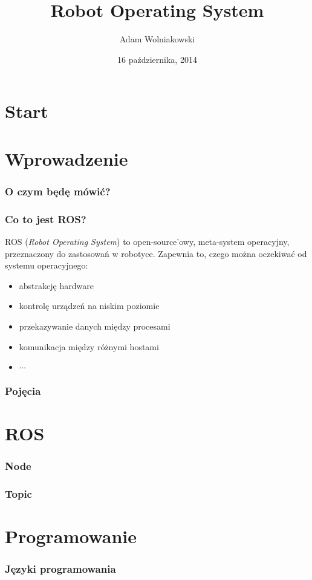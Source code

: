 \documentclass[12pt,a4paper,portrait]{beamer}
\author[AW]{Adam Wolniakowski}
\institute[WM PB]{Politechnika Białostocka}
\title[ROS]{Robot Operating System}
\date{16 października, 2014}
\begin{document}
\section{Start}
\begin{frame}
\titlepage
\end{frame}



\section{Wprowadzenie}
\begin{frame}
\frametitle{O czym będę mówić?}
\end{frame}

\begin{frame}
\frametitle{Co to jest ROS?}
ROS (\textit{Robot Operating System}) to open-source'owy, meta-system operacyjny, przeznaczony do zastosowań w robotyce.
Zapewnia to, czego można oczekiwać od systemu operacyjnego:
\begin{itemize}
\item abstrakcję hardware
\item kontrolę urządzeń na niskim poziomie
\item przekazywanie danych między procesami
\item komunikacja między różnymi hostami
\item $\cdots$
\end{itemize}
\end{frame}

\begin{frame}
\frametitle{Pojęcia}

\end{frame}



\section{ROS}
\begin{frame}
\frametitle{Node}
\end{frame}

\begin{frame}
\frametitle{Topic}
\end{frame}



\section{Programowanie}
\begin{frame}
\frametitle{Języki programowania}
\end{frame}
\end{document}
